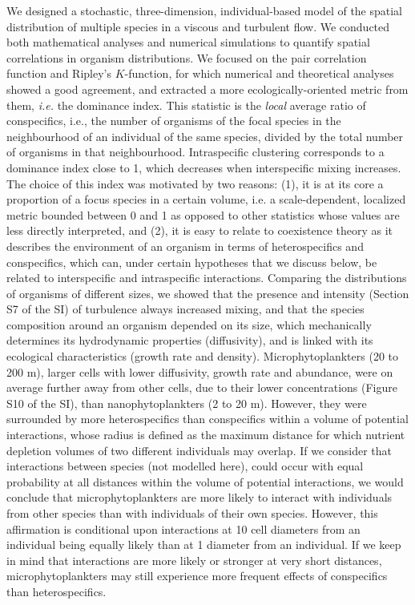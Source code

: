 \documentclass[english]{article}
\begin{document}
We designed a stochastic, three-dimension, individual-based model
of the spatial distribution of multiple species in a viscous and turbulent
flow. We conducted both mathematical analyses and numerical simulations
to quantify spatial correlations in organism distributions. We focused
on the pair correlation function and Ripley's $K$-function, for which
numerical and theoretical analyses showed a good agreement, and extracted
a more ecologically-oriented metric from them, \textit{i.e.} the dominance
index. This statistic is the \textit{local} average ratio of conspecifics,
i.e., the number of organisms of the focal species in the neighbourhood
of an individual of the same species, divided by the total number
of organisms in that neighbourhood. Intraspecific clustering corresponds
to a dominance index close to 1, which decreases when interspecific
mixing increases. The choice of this index was motivated by two reasons:
(1), it is at its core a proportion of a focus species in a certain
volume, i.e. a scale-dependent, localized metric bounded between 0
and 1 as opposed to other statistics whose values are less directly
interpreted, and (2), it is easy to relate to coexistence theory as
it describes the environment of an organism in terms of heterospecifics
and conspecifics, which can, under certain hypotheses that we discuss
below, be related to interspecific and intraspecific interactions.
Comparing the distributions of organisms of different sizes, we showed
that the presence and intensity (Section S7 of the SI) of turbulence
always increased mixing, and that the species composition around an
organism depended on its size, which mechanically determines its hydrodynamic
properties (diffusivity), and is linked with its ecological characteristics
(growth rate and density). Microphytoplankters (20 to 200 \textmu
m), larger cells with lower diffusivity, growth rate and abundance,
were on average further away from other cells, due to their lower
concentrations (Figure S10 of the SI), than nanophytoplankters (2
to 20 \textmu m). However, they were surrounded by more heterospecifics
than conspecifics within a volume of potential interactions, whose
radius is defined as the maximum distance for which nutrient depletion
volumes of two different individuals may overlap. If we consider that
interactions between species (not modelled here), could occur with
equal probability at all distances within the volume of potential
interactions, we would conclude that microphytoplankters are more
likely to interact with individuals from other species than with individuals
of their own species. However, this affirmation is conditional upon
interactions at 10 cell diameters from an individual being equally
likely than at 1 diameter from an individual. If we keep in mind that
interactions are more likely or stronger at very short distances,
microphytoplankters may still experience more frequent effects of
conspecifics than heterospecifics.
\end{document}
